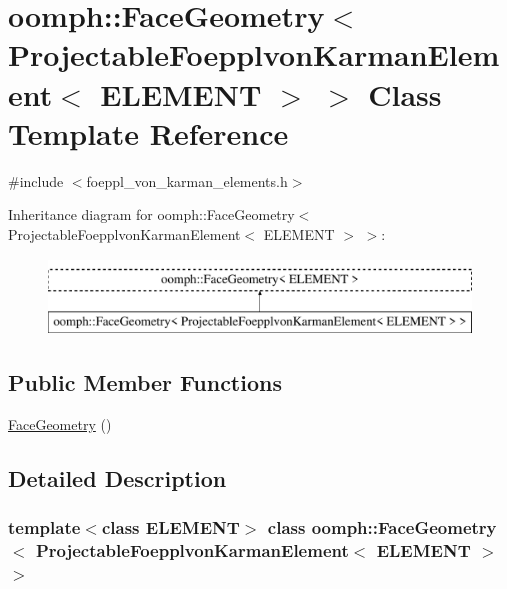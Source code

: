 \hypertarget{classoomph_1_1FaceGeometry_3_01ProjectableFoepplvonKarmanElement_3_01ELEMENT_01_4_01_4}{}\section{oomph\+:\+:Face\+Geometry$<$ Projectable\+Foepplvon\+Karman\+Element$<$ E\+L\+E\+M\+E\+NT $>$ $>$ Class Template Reference}
\label{classoomph_1_1FaceGeometry_3_01ProjectableFoepplvonKarmanElement_3_01ELEMENT_01_4_01_4}


{\ttfamily \#include $<$foeppl\+\_\+von\+\_\+karman\+\_\+elements.\+h$>$}

Inheritance diagram for oomph\+:\+:Face\+Geometry$<$ Projectable\+Foepplvon\+Karman\+Element$<$ E\+L\+E\+M\+E\+NT $>$ $>$\+:\begin{figure}[H]
\begin{center}
\leavevmode
\includegraphics[height=2.000000cm]{classoomph_1_1FaceGeometry_3_01ProjectableFoepplvonKarmanElement_3_01ELEMENT_01_4_01_4}
\end{center}
\end{figure}
\subsection*{Public Member Functions}
\begin{DoxyCompactItemize}
\item 
\hyperlink{classoomph_1_1FaceGeometry_3_01ProjectableFoepplvonKarmanElement_3_01ELEMENT_01_4_01_4_ad26199516dd27f26e8a8178dfc5e1160}{Face\+Geometry} ()
\end{DoxyCompactItemize}


\subsection{Detailed Description}
\subsubsection*{template$<$class E\+L\+E\+M\+E\+NT$>$\newline
class oomph\+::\+Face\+Geometry$<$ Projectable\+Foepplvon\+Karman\+Element$<$ E\+L\+E\+M\+E\+N\+T $>$ $>$}

